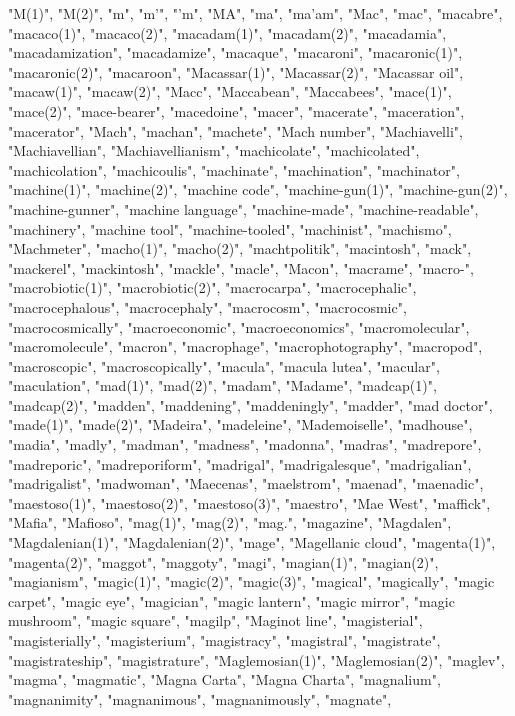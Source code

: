 "M(1)",
"M(2)",
"m",
"m'",
"'m",
"MA",
"ma",
"ma'am",
"Mac",
"mac",
"macabre",
"macaco(1)",
"macaco(2)",
"macadam(1)",
"macadam(2)",
"macadamia",
"macadamization",
"macadamize",
"macaque",
"macaroni",
"macaronic(1)",
"macaronic(2)",
"macaroon",
"Macassar(1)",
"Macassar(2)",
"Macassar oil",
"macaw(1)",
"macaw(2)",
"Macc",
"Maccabean",
"Maccabees",
"mace(1)",
"mace(2)",
"mace-bearer",
"macedoine",
"macer",
"macerate",
"maceration",
"macerator",
"Mach",
"machan",
"machete",
"Mach number",
"Machiavelli",
"Machiavellian",
"Machiavellianism",
"machicolate",
"machicolated",
"machicolation",
"machicoulis",
"machinate",
"machination",
"machinator",
"machine(1)",
"machine(2)",
"machine code",
"machine-gun(1)",
"machine-gun(2)",
"machine-gunner",
"machine language",
"machine-made",
"machine-readable",
"machinery",
"machine tool",
"machine-tooled",
"machinist",
"machismo",
"Machmeter",
"macho(1)",
"macho(2)",
"machtpolitik",
"macintosh",
"mack",
"mackerel",
"mackintosh",
"mackle",
"macle",
"Macon",
"macrame",
"macro-",
"macrobiotic(1)",
"macrobiotic(2)",
"macrocarpa",
"macrocephalic",
"macrocephalous",
"macrocephaly",
"macrocosm",
"macrocosmic",
"macrocosmically",
"macroeconomic",
"macroeconomics",
"macromolecular",
"macromolecule",
"macron",
"macrophage",
"macrophotography",
"macropod",
"macroscopic",
"macroscopically",
"macula",
"macula lutea",
"macular",
"maculation",
"mad(1)",
"mad(2)",
"madam",
"Madame",
"madcap(1)",
"madcap(2)",
"madden",
"maddening",
"maddeningly",
"madder",
"mad doctor",
"made(1)",
"made(2)",
"Madeira",
"madeleine",
"Mademoiselle",
"madhouse",
"madia",
"madly",
"madman",
"madness",
"madonna",
"madras",
"madrepore",
"madreporic",
"madreporiform",
"madrigal",
"madrigalesque",
"madrigalian",
"madrigalist",
"madwoman",
"Maecenas",
"maelstrom",
"maenad",
"maenadic",
"maestoso(1)",
"maestoso(2)",
"maestoso(3)",
"maestro",
"Mae West",
"maffick",
"Mafia",
"Mafioso",
"mag(1)",
"mag(2)",
"mag.",
"magazine",
"Magdalen",
"Magdalenian(1)",
"Magdalenian(2)",
"mage",
"Magellanic cloud",
"magenta(1)",
"magenta(2)",
"maggot",
"maggoty",
"magi",
"magian(1)",
"magian(2)",
"magianism",
"magic(1)",
"magic(2)",
"magic(3)",
"magical",
"magically",
"magic carpet",
"magic eye",
"magician",
"magic lantern",
"magic mirror",
"magic mushroom",
"magic square",
"magilp",
"Maginot line",
"magisterial",
"magisterially",
"magisterium",
"magistracy",
"magistral",
"magistrate",
"magistrateship",
"magistrature",
"Maglemosian(1)",
"Maglemosian(2)",
"maglev",
"magma",
"magmatic",
"Magna Carta",
"Magna Charta",
"magnalium",
"magnanimity",
"magnanimous",
"magnanimously",
"magnate",
